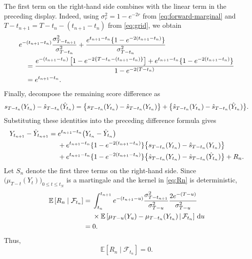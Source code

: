 \documentclass[11pt]{article}
\theoremstyle{definition}
\newcommand{\E}{\mathbb{E}}
\newcommand{\dd}{\,\mathrm{d}}
\begin{document}
The first term on the right-hand side combines with the linear term
in the preceding display. Indeed, using
$\sigma_r^2=1-e^{-2r}$ from \eqref{eq:forward-marginal} and
$T-t_{n+1}=T-t_n-(t_{n+1}-t_n)$ from \eqref{eq:grid}, we obtain
\begin{align}
&e^{-(t_{n+1}-t_n)}
\frac{\sigma_{T-t_{n+1}}^2}{\sigma_{T-t_n}^2}
{}+\frac{e^{t_{n+1}-t_n}\{1-e^{-2(t_{n+1}-t_n)}\}}
{\sigma_{T-t_n}^2}\notag\\
&\quad=
\frac{
    e^{-(t_{n+1}-t_n)}
    \left[1-e^{-2\{T-t_n-(t_{n+1}-t_n)\}}\right]
    +e^{t_{n+1}-t_n}\{1-e^{-2(t_{n+1}-t_n)}\}
}{
    1-e^{-2(T-t_n)}
}\notag\\
&\quad=e^{t_{n+1}-t_n}.\notag
\end{align}
Finally, decompose the remaining score difference as
\begin{align}
s_{T-t_n}(Y_{t_n})
-\hat s_{T-t_n}(\hat Y_{t_n})
=
\bigl\{
    s_{T-t_n}(Y_{t_n})
    -\hat s_{T-t_n}(Y_{t_n})
\bigr\}
+
\bigl\{
    \hat s_{T-t_n}(Y_{t_n})
    -\hat s_{T-t_n}(\hat Y_{t_n})
\bigr\}.\notag
\end{align}
Substituting these identities into the preceding difference formula
gives
\begin{align}
    Y_{t_{n+1}}-\hat Y_{t_{n+1}}
    ={}&e^{t_{n+1}-t_n}\bigl(Y_{t_n}-\hat Y_{t_n}\bigr)\notag\\
    &+e^{t_{n+1}-t_n}\{1-e^{-2(t_{n+1}-t_n)}\}
      \bigl\{s_{T-t_n}(Y_{t_n})-
      \hat s_{T-t_n}(Y_{t_n})\bigr\}\notag\\
    &+e^{t_{n+1}-t_n}\{1-e^{-2(t_{n+1}-t_n)}\}
      \bigl\{\hat s_{T-t_n}(Y_{t_n})-
      \hat s_{T-t_n}(\hat Y_{t_n})\bigr\}
      +R_n.
\label{eq:error-recursion-vector}
\end{align}
Let $S_n$ denote the first three terms on the right-hand side. Since
$\bigl(\mu_{T-t}(Y_t)\bigr)_{0\le t\le t_N}$ is a martingale and the
kernel in \eqref{eq:Rn} is deterministic,
\begin{align}
\E\left[R_n\mid\mathcal F_{t_n}\right]
={}&\int_{t_n}^{t_{n+1}}
 e^{-(t_{n+1}-u)}
 \frac{\sigma_{T-t_{n+1}}^2}{\sigma_{T-u}^2}
 \frac{2e^{-(T-u)}}{\sigma_{T-u}^2}\notag\\
&\times
\E\left[
    \mu_{T-u}(Y_u)-\mu_{T-t_n}(Y_{t_n})
    \,\middle|\,
    \mathcal F_{t_n}
\right]\dd u\notag\\
={}&0.\notag
\end{align}
Thus,
\begin{equation}
    \E\left[R_n\mid\mathcal F_{t_n}\right]=0.
    \label{eq:Rn-centered}
\end{equation}
\end{document}
